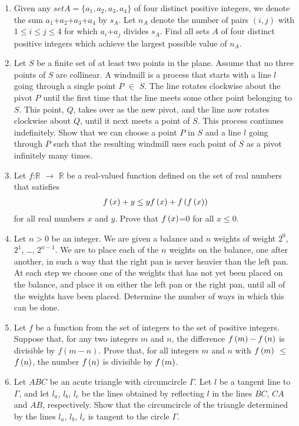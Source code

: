 \documentclass{article}
\begin{document}
\begin{enumerate}
	\item Given any $setA=\{a_{1}, a_{2}, a_{3}, a_{4}\}$ of four distinct positive integers, we denote the sum $a_{1}$+$a_{2}$+$a_{3}$+$a_{4}$ by $s_{A}$. Let $n_{A}$ denote the number of pairs $ ( i, j) $ with $1\leq{i}\leq{j}\leq{4}$ for which $a_{i}$+$a_{j}$ divides $s_{A}$. Find all sets $A$ of four distinct positive integers which achieve the largest possible value of $n_{A}$.
\item Let $S$ be a finite set of at least two points in the plane. Assume that no three points of $S$ are collinear. A windmill is a process that starts with a line $l$ going through a single point $P$ $\in$ $S$. The line rotates clockwise about the pivot $P$ until the first time that the line meets some other point belonging to $S$. This point, $Q$, takes over as the new pivot, and the line now rotates clockwise about $Q$, until it next meets a point of $S$. This process continues indefinitely.
	Show that we can choose a point $P$ in $S$ and a line $l$ going through $P$ such that the resulting windmill uses each point of $S$ as a pivot infinitely many times.
\item Let $f$:$\mathbb{R}$ $\rightarrow$ $\mathbb{R}$ be a real-valued function defined on the set of real numbers that satisfies
	\begin{align*}
	f \left(x\right)+y \leq {y f \ensuremath{\left(x\right)}}+f \left(f \left(x\right) \right) 
	\end{align*}
		for all real numbers $x$ and $y$. Prove that $f \left(x\right)$=$0$ for all $x\leq{0}$.
	\item Let $n > 0$ be an integer. We are given a balance and $n$ weights of weight $2^{0}$, $2^{1}$, \dots, $2^{n-1}$. We are to place each of the $n$ weights on the balance, one after another, in such a way that the right pan is never heavier than the left pan. At each step we choose one of the weights that has not yet been placed on the balance, and place it on either the left pan or the right pan, until all of the weights have been placed.
		Determine the number of ways in which this can be done.
	\item  Let $f$ be a function from the set of integers to the set of positive integers. Suppose that, for any two integers $m$ and $n$, the difference $f \left(m\right) -f \left(n\right) $ is divisible by $f ( m-n) $. Prove that, for all integers $m$ and $n$ with $f \left(m\right) $ $\leq$ ${f \left(n\right) }$, the number $f \left(n\right) $ is divisible by $f \left(m\right) $.
	\item Let $ABC$ be an acute triangle with circumcircle $\Gamma$. Let $l$ be a tangent line to $\Gamma$, and let $l_{a}$, $l_{b}$, $l_{c}$ be the lines obtained by reflecting $l$ in the lines $BC$, $CA$ and $AB$, respectively. Show that the circumcircle of the triangle determined by the lines $l_{a}$, $l_{b}$, $l_{c}$ is tangent to the circle $\Gamma$.
\end{enumerate}
\end{document}
